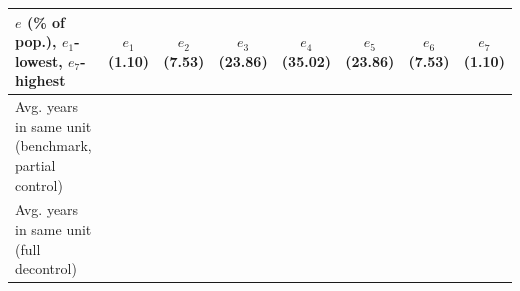 \begin{table}[p]
\footnotesize
\renewcommand{\arraystretch}{1.2}
\begin{center}
\begin{tabular}{lccccccc}
\toprule
$e$ (\% of pop.), $e_{1}$-lowest, $e_{7}$-highest & $e_{1}$ (1.10) & $e_{2}$ (7.53) & $e_{3}$ (23.86) & $e_{4}$ (35.02) & $e_{5}$ (23.86) & $e_{6}$ (7.53) & $e_{7}$ (1.10)\\ 
\midrule
Avg. years in same unit (benchmark, partial control) & \\
Avg. years in same unit (full decontrol) &  \\
\bottomrule
\end{tabular}
\end{center}
\normalsize
\end{table}
